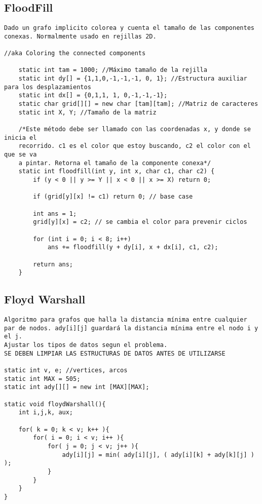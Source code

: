 \documentclass[10pt,letterpaper,twocolumn,twosided]{article}
\begin{document}
\subsection{FloodFill}
\begin{lstlisting}
Dado un grafo implicito colorea y cuenta el tamaño de las componentes conexas. Normalmente usado en rejillas 2D.

//aka Coloring the connected components

	static int tam = 1000; //Máximo tamaño de la rejilla
	static int dy[] = {1,1,0,-1,-1,-1, 0, 1}; //Estructura auxiliar para los desplazamientos
	static int dx[] = {0,1,1, 1, 0,-1,-1,-1};
	static char grid[][] = new char [tam][tam]; //Matriz de caracteres
	static int X, Y; //Tamaño de la matriz
	
	/*Este método debe ser llamado con las coordenadas x, y donde se inicia el 
	recorrido. c1 es el color que estoy buscando, c2 el color con el que se va 
	a pintar. Retorna el tamaño de la componente conexa*/
	static int floodfill(int y, int x, char c1, char c2) { 
		if (y < 0 || y >= Y || x < 0 || x >= X) return 0;
		
		if (grid[y][x] != c1) return 0; // base case
		
		int ans = 1; 
		grid[y][x] = c2; // se cambia el color para prevenir ciclos
		
		for (int i = 0; i < 8; i++)
			ans += floodfill(y + dy[i], x + dx[i], c1, c2);
		
		return ans;
	}
\end{lstlisting}

\subsection{Floyd Warshall}
\begin{lstlisting}
Algoritmo para grafos que halla la distancia mínima entre cualquier par de nodos. ady[i][j] guardará la distancia mínima entre el nodo i y el j.
Ajustar los tipos de datos segun el problema.
SE DEBEN LIMPIAR LAS ESTRUCTURAS DE DATOS ANTES DE UTILIZARSE

static int v, e; //vertices, arcos
static int MAX = 505;     
static int ady[][] = new int [MAX][MAX];

static void floydWarshall(){
    int i,j,k, aux;
    
    for( k = 0; k < v; k++ ){
        for( i = 0; i < v; i++ ){
            for( j = 0; j < v; j++ ){
                ady[i][j] = min( ady[i][j], ( ady[i][k] + ady[k][j] ) );
            }
        }
    }
}
\end{lstlisting}
\end{document}
